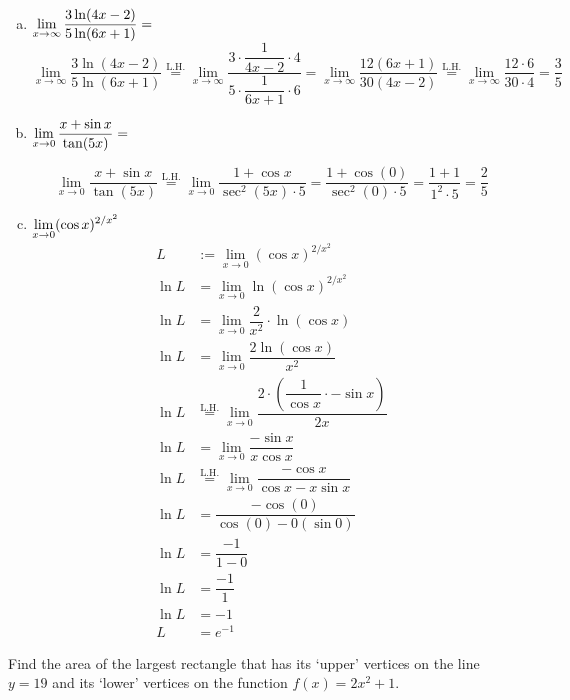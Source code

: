 \documentclass[12pt,letterpaper]{exam}
\newcommand{\lh}{\stackrel{\text{L.H.}}{=}}
\begin{document}
\begin{questions}
\begin{enumerate}[(a)]
	\item $\displaystyle\lim_{x \to \infty} \dfrac{3 \ln(4x - 2)}{5 \ln(6x + 1)}=$  \vfill
		\[
		\lim_{x \to \infty} \dfrac{3 \ln(4x - 2)}{5 \ln(6x + 1)} \lh \lim_{x \to \infty} \dfrac{3 \cdot \dfrac{1}{4x - 2} \cdot 4}{5 \cdot \dfrac{1}{6x + 1} \cdot 6}= \lim_{x \to \infty} \dfrac{12 (6x + 1)}{30(4x - 2)} \lh \lim_{x \to \infty} \dfrac{12 \cdot 6}{30 \cdot 4}= \dfrac{3}{5}
		\] \vfill
	
	\newpage
	
	\phantom{} \par
	\item $\displaystyle\lim_{x \to 0} \dfrac{x + \sin x}{\tan(5x)}=$  \par\vspace{2.25cm}
		\[
		\lim_{x \to 0} \dfrac{x + \sin x}{\tan(5x)} \lh \lim_{x \to 0} \dfrac{1 + \cos x}{\sec^2(5x) \cdot 5}= \dfrac{1 + \cos(0)}{\sec^2(0) \cdot 5}= \dfrac{1 + 1}{1^2  \cdot 5}= \dfrac{2}{5}
		\] \par\vspace{2.25cm}
	
	\item $\displaystyle\lim_{x \to 0} (\cos x)^{2/x^2}$ \pspace
		\[
		\begin{aligned}
		L&:= \lim_{x \to 0} (\cos x)^{2/x^2} \\[0.2cm]
		\ln L&= \lim_{x \to 0} \ln(\cos x)^{2/x^2} \\[0.2cm]
		\ln L&= \lim_{x \to 0} \dfrac{2}{x^2} \cdot \ln(\cos x) \\[0.2cm]
		\ln L&= \lim_{x \to 0} \dfrac{2 \ln(\cos x)}{x^2} \\[0.1cm]
		\ln L&\lh \lim_{x \to 0} \dfrac{2 \cdot \left( \dfrac{1}{\cos x} \cdot -\sin x \right)}{2x} \\[0.2cm]
		\ln L&= \lim_{x \to 0} \dfrac{-\sin x}{x \cos x} \\[0.2cm]
		\ln L&\lh \lim_{x \to 0} \dfrac{-\cos x}{\cos x - x \sin x} \\[0.2cm]
		\ln L&= \dfrac{-\cos(0)}{\cos(0) - 0 (\sin 0)} \\[0.2cm]
		\ln L&= \dfrac{-1}{1 - 0} \\[0.2cm]
		\ln L&= \dfrac{-1}{1} \\[0.2cm]
		\ln L&= -1 \\[0.2cm]
		L&= e^{-1}
		\end{aligned}
		\]	
	\end{enumerate}



\newpage
\question[16] Find the area of the largest rectangle that has its `upper' vertices on the line $y= 19$ and its `lower' vertices on the function $f(x)= 2x^2 + 1$. \pspace


\end{questions}
\end{document}
